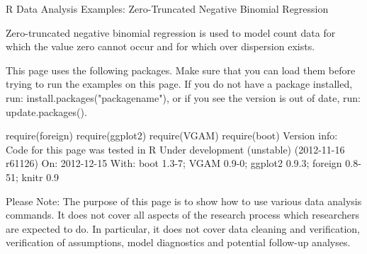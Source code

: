 R Data Analysis Examples: Zero-Truncated Negative Binomial Regression

Zero-truncated negative binomial regression is used to model count data for which the value zero cannot occur and for which over dispersion exists.

This page uses the following packages. Make sure that you can load them before trying to run the examples on this page. If you do not have a package installed, run: install.packages("packagename"), or if you see the version is out of date, run: update.packages().

require(foreign)
require(ggplot2)
require(VGAM)
require(boot)
Version info: Code for this page was tested in R Under development (unstable) (2012-11-16 r61126)
On: 2012-12-15
With: boot 1.3-7; VGAM 0.9-0; ggplot2 0.9.3; foreign 0.8-51; knitr 0.9

Please Note: The purpose of this page is to show how to use various data analysis commands. It does not cover all aspects of the research process which researchers are expected to do. In particular, it does not cover data cleaning and verification, verification of assumptions, model diagnostics and potential follow-up analyses.
